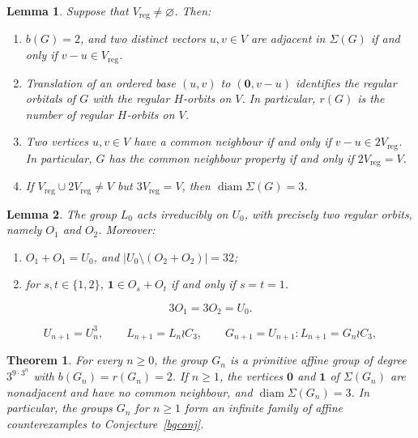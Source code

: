 \documentclass[10pt,a4paper]{amsart}
\newtheorem{lem}{Lemma}
\newtheorem{thm}{Theorem}
\newcommand\diam{\operatorname{diam}}
\begin{document}
\begin{lem}\label{criterion}
Suppose that $V_{\mathrm{reg}}\ne\varnothing$. Then:
\begin{enumerate}
\item[(i)] $b(G)=2$, and two distinct vectors $u,v\in V$ are adjacent in $\Sigma(G)$ if and only if $v-u\in V_{\mathrm{reg}}$.
\item[(ii)] Translation of an ordered base $(u,v)$ to $(\mathbf0,v-u)$ identifies the regular orbitals of $G$ with the regular $H$-orbits on $V$. In particular, $r(G)$ is the number of regular $H$-orbits on $V$.
\item[(iii)] Two vertices $u,v\in V$ have a common neighbour if and only if $v-u\in2V_{\mathrm{reg}}$. In particular, $G$ has the common neighbour property if and only if $2V_{\mathrm{reg}}=V$.
\item[(iv)] If $V_{\mathrm{reg}}\cup2V_{\mathrm{reg}}\ne V$ but $3V_{\mathrm{reg}}=V$, then $\diam\Sigma(G)=3$.
\end{enumerate}
\end{lem}

\begin{lem}\label{affineinput}
The group $L_0$ acts irreducibly on $U_0$, with precisely two regular orbits, namely $O_1$ and $O_2$. Moreover:
\begin{enumerate}
\item[{(i)}] $O_1+O_1=U_0$, and $|U_0\setminus(O_2+O_2)|=32$;
\item[{(ii)}] for $s,t\in\{1,2\}$, $\mathbf1\in O_s+O_t$ if and only if $s=t=1$.
\end{enumerate}
\end{lem}

\begin{equation}\label{eq:triple}
3O_1=3O_2=U_0.
\end{equation}

\begin{equation}\label{eq:tower}
U_{n+1}=U_n^3,\qquad
L_{n+1}=L_n\wr C_3,\qquad
G_{n+1}=U_{n+1}{:}L_{n+1}=G_n\wr C_3,
\end{equation}

\begin{thm}\label{thm:affine}
For every $n\ge0$, the group $G_n$ is a primitive affine group of degree $3^{9\cdot3^n}$ with $b(G_n)=r(G_n)=2$. If $n\ge1$, the vertices $\mathbf0$ and $\mathbf1$ of $\Sigma(G_n)$ are nonadjacent and have no common neighbour, and $\diam\Sigma(G_n)=3$. In particular, the groups $G_n$ for $n\ge1$ form an infinite family of affine counterexamples to Conjecture~\ref{bgconj}.
\end{thm}
\end{document}
